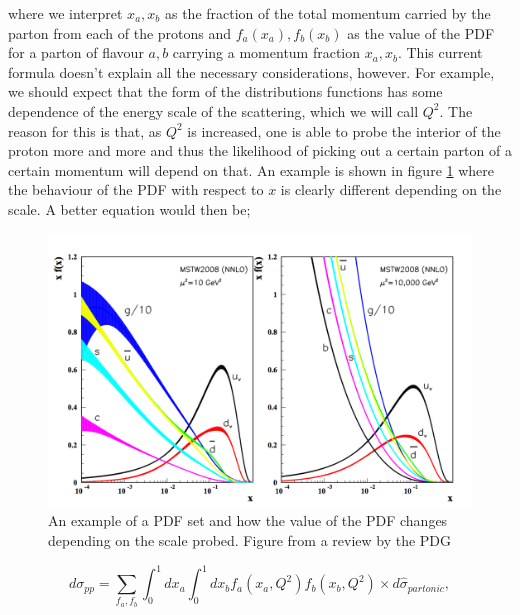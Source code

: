 where we interpret $x_a, x_b$ as the fraction of the total momentum carried by the parton from each of the protons and $f_a (x_a), f_b(x_b)$ as the value of the PDF for a parton of flavour $a,b$ carrying a momentum fraction $x_a, x_b$. This current formula doesn't explain all the necessary considerations, however. For example, we should expect that the form of the distributions functions has some dependence of the energy scale of the scattering, which we will call $Q^2$. The reason for this is that, as $Q^2$ is increased, one is able to probe the interior of the proton more and more and thus the likelihood of picking out a certain parton of a certain momentum will depend on that. An example is shown in figure \ref{fig:PDF} where the behaviour of the PDF with respect to $x$ is clearly different depending on the scale. A better equation would then be;

\begin{figure}[t]
\centering
\includegraphics[scale=0.7]{Images/PDF.png} 
\caption{An example of a PDF set and how the value of the PDF changes depending on the scale probed. Figure from a review by the PDG \cite{PDG}}
\label{fig:PDF}
\end{figure}

\begin{equation}
d \sigma_{pp} = \sum_{f_a, f_b} \int_0^1 dx_a \int_0^1 dx_b f_a(x_a, Q^2) f_b(x_b, Q^2) \times d\hat{\sigma}_{partonic},
\end{equation}

